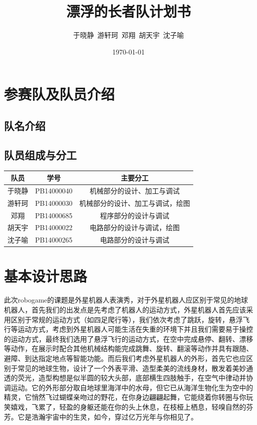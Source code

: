 \documentclass{ctexart}
\begin{document}

\title{漂浮的长者队计划书}
\author{于晓静\ 游轩珂\ 邓翔\ 胡天宇\ 沈子喻}
\date{\today}

\maketitle

\tableofcontents
\newpage
\section{参赛队及队员介绍}
\subsection{队名介绍}
\subsection{队员组成与分工}
\begin{center}
\begin{tabular}{|c|c|c|}
	\hline
	队员&学号&主要分工\\
	\hline
	于晓静&PB14000040&机械部分的设计、加工与调试\\
	\hline
	游轩珂&PB14000030&机械部分的设计、加工与调试，绘图\\
	\hline
	邓翔&PB14000685&程序部分的设计与调试\\
	\hline
	胡天宇&PB14000022&电路部分的设计与调试，绘图\\
	\hline
	沈子喻&PB14000265&电路部分的设计与调试\\
	\hline
\end{tabular}
\end{center}

\section{基本设计思路}
此次robogame的课题是外星机器人表演秀，对于外星机器人应区别于常见的地球机器人，首先我们的出发点是先考虑了机器人的运动方式，外星机器人首先应该采用区别于常规的运动方式（如四足爬行等），我们依次考虑了跳跃，旋转，悬浮飞行等运动方式，考虑到外星机器人可能生活在失重的环境下并且我们需要易于操控的运动方式，最终我们选用了悬浮飞行的运动方式，在空中完成悬停、翻转、漂移等动作，在展示时配合其他机械结构能完成跳舞、旋转、翻滚等动作并具有跟随、避障、到达指定地点等智能功能。而后我们考虑外星机器人的外形，首先它也应区别于常见的地球生物，设计了一个外表平滑、造型柔美的流线身材，散发着美妙通透的荧光，造型构想是似半圆的较大头部，底部横生四肢触手，在空气中律动并协调运动。它的外形部分取自地球里海洋中的水母，但它已从海洋生物化生为空中的精灵，它悄然飞过蝴蝶亲吻过的野花，在你身边翩翩起舞，它能绕着你转圈与你玩笑嬉戏，飞累了，轻盈的身躯还能在你的头上休息，在枝桠上栖息，轻嗅自然的芬芳。它是浩瀚宇宙中的生灵，如今，穿过亿万光年与你相见了。
\end{document}

